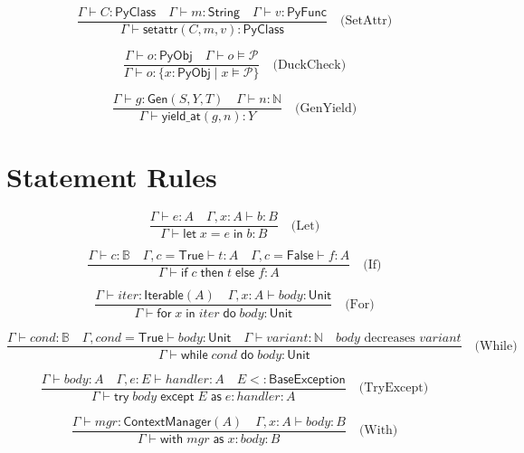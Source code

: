\documentclass[11pt,a4paper]{report}
\theoremstyle{definition}
\theoremstyle{plain}
\newcommand{\Nat}{\mathbb{N}}
\newcommand{\Bool}{\mathbb{B}}
\newcommand{\PyObj}{\mathsf{PyObj}}
\newcommand{\PyClass}{\mathsf{PyClass}}
\newcommand{\PyFunc}{\mathsf{PyFunc}}
\begin{document}
\[
  \frac{
    \Gamma \vdash C : \PyClass \quad
    \Gamma \vdash m : \mathsf{String} \quad
    \Gamma \vdash v : \PyFunc
  }{
    \Gamma \vdash \mathsf{setattr}(C, m, v) : \PyClass
  } \quad \text{(SetAttr)}
\]

\[
  \frac{
    \Gamma \vdash o : \PyObj \quad
    \Gamma \vdash o \models \mathcal{P}
  }{
    \Gamma \vdash o : \{x : \PyObj \mid x \models \mathcal{P}\}
  } \quad \text{(DuckCheck)}
\]

\[
  \frac{
    \Gamma \vdash g : \mathsf{Gen}(S, Y, T) \quad
    \Gamma \vdash n : \Nat
  }{
    \Gamma \vdash \mathsf{yield\_at}(g, n) : Y
  } \quad \text{(GenYield)}
\]

\section{Statement Rules}

\[
  \frac{
    \Gamma \vdash e : A \quad
    \Gamma, x : A \vdash b : B
  }{
    \Gamma \vdash \mathsf{let}\; x = e\; \mathsf{in}\; b : B
  } \quad \text{(Let)}
\]

\[
  \frac{
    \Gamma \vdash c : \Bool \quad
    \Gamma, c = \mathsf{True} \vdash t : A \quad
    \Gamma, c = \mathsf{False} \vdash f : A
  }{
    \Gamma \vdash \mathsf{if}\; c\; \mathsf{then}\; t\; \mathsf{else}\; f : A
  } \quad \text{(If)}
\]

\[
  \frac{
    \Gamma \vdash \mathit{iter} : \mathsf{Iterable}(A) \quad
    \Gamma, x : A \vdash \mathit{body} : \mathsf{Unit}
  }{
    \Gamma \vdash \mathsf{for}\; x\; \mathsf{in}\; \mathit{iter}\; \mathsf{do}\; \mathit{body} : \mathsf{Unit}
  } \quad \text{(For)}
\]

\[
  \frac{
    \Gamma \vdash \mathit{cond} : \Bool \quad
    \Gamma, \mathit{cond} = \mathsf{True} \vdash \mathit{body} : \mathsf{Unit} \quad
    \Gamma \vdash \mathit{variant} : \Nat \quad
    \mathit{body}\text{ decreases }\mathit{variant}
  }{
    \Gamma \vdash \mathsf{while}\; \mathit{cond}\; \mathsf{do}\; \mathit{body} : \mathsf{Unit}
  } \quad \text{(While)}
\]

\[
  \frac{
    \Gamma \vdash \mathit{body} : A \quad
    \Gamma, e : E \vdash \mathit{handler} : A \quad
    E <: \mathsf{BaseException}
  }{
    \Gamma \vdash \mathsf{try}\; \mathit{body}\; \mathsf{except}\; E\; \mathsf{as}\; e : \mathit{handler} : A
  } \quad \text{(TryExcept)}
\]

\[
  \frac{
    \Gamma \vdash \mathit{mgr} : \mathsf{ContextManager}(A) \quad
    \Gamma, x : A \vdash \mathit{body} : B
  }{
    \Gamma \vdash \mathsf{with}\; \mathit{mgr}\; \mathsf{as}\; x : \mathit{body} : B
  } \quad \text{(With)}
\]
\end{document}
